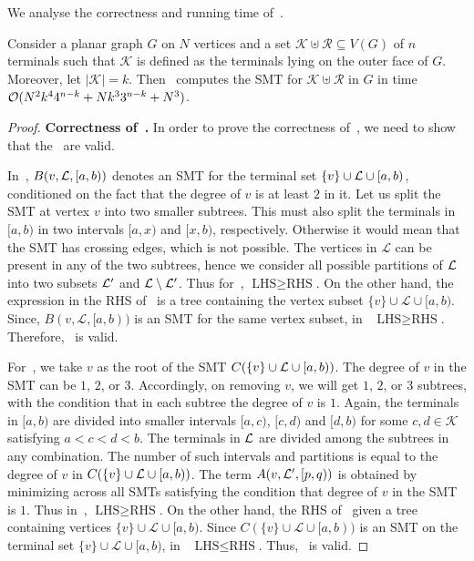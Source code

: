 We analyse the correctness and running time of~.
    \begin{theorem} \label{thm:algo1_correct}
     Consider a planar graph $G$ on $N$ vertices and a set $\mathcal{K} \uplus \mathcal{R} \subseteq V(G)$ of $n$ terminals such that $\mathcal{K}$ is defined as the terminals lying on the outer face of $G$. Moreover, let $|\mathcal{K}| = k$. Then~ computes the SMT for $\mathcal{K} \uplus \mathcal{R}$ in $G$ in time $\mathcal{O}(N^2k^44^{n-k} + Nk^33^{n-k}+N^3)$.
    \end{theorem}
    \begin{proof}
{\bf Correctness of~.} 
In order to prove the correctness of~, we need to show that the~ are valid.

        In~, $B(v,\mathcal{L},[a,b))$ denotes an SMT for the terminal set $\{v\} \cup \mathcal{L} \cup [a,b)$, conditioned on the fact that the degree of $v$ is at least $2$ in it. Let us split the SMT at vertex $v$ into two smaller subtrees. This must also split the terminals in $[a,b)$ in two intervals $[a,x)$ and $[x,b)$, respectively. Otherwise it would mean that the SMT has crossing edges, which is not possible. The vertices in $\mathcal{L}$ can be present in any of the two subtrees, hence we consider all possible partitions of $\mathcal{L}$ into two subsets $\mathcal{L}'$ and $\mathcal{L} \setminus \mathcal{L}'$. Thus for~, $\mbox{LHS} \geq \mbox{RHS}$. On the other hand, the expression in the RHS of~ is a tree containing the vertex subset $\{v\} \cup \mathcal{L} \cup [a,b)$. Since, $B(v,\mathcal{L},[a,b))$ is an SMT for the same vertex subset, in~  $\mbox{LHS} \geq \mbox{RHS}$. Therefore,~ is valid.

        For~, we take $v$ as the root of the SMT $C(\{v\} \cup \mathcal{L} \cup [a,b))$. The degree of $v$ in the SMT can be $1$, $2$, or $3$. Accordingly, on removing $v$, we will get $1$, $2$, or $3$ subtrees, with the condition that in each subtree the degree of $v$ is $1$. Again, the terminals in $[a,b)$ are divided into smaller intervals $[a,c)$, $[c,d)$ and $[d,b)$ for some $c,d \in \mathcal{K}$ satisfying $a<c<d<b$. The terminals in $\mathcal{L}$ are divided among the subtrees in any combination. The number of such intervals and partitions is equal to the degree of $v$ in $C(\{v\} \cup \mathcal{L} \cup [a,b))$. The term $A(v,\mathcal{L}',[p,q))$ is obtained by minimizing across all SMTs satisfying the condition that degree of $v$ in the SMT is $1$. Thus in~, $\mbox{LHS} \geq \mbox{RHS}$. On the other hand, the RHS of~ given a tree containing vertices $\{v\} \cup \mathcal{L} \cup [a,b)$. Since $C(\{v\} \cup \mathcal{L} \cup [a,b))$ is an SMT on the terminal set $\{v\} \cup \mathcal{L} \cup [a,b)$, in~ $\mbox{LHS} \leq \mbox{RHS}$. Thus,~ is valid.


\end{proof}
